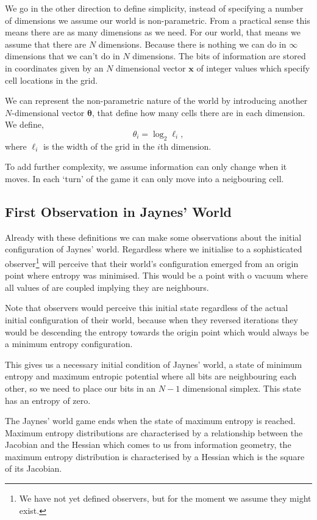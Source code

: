 \documentclass[11pt,a4paper]{article}
\begin{document}
We go in the other direction to define simplicity, instead of specifying a number of dimensions we assume our world is non-parametric. From a practical sense this means there are as many dimensions as we need. For our world, that means we assume that there are $N$ dimensions. Because there is nothing we can do in $\infty$ dimensions that we can't do in $N$ dimensions.  The bits of information are stored in coordinates given by an $N$ dimensional vector $\mathbf{x}$ of integer values which specify cell locations in the grid.

We can represent the non-parametric nature of the world by introducing another $N$-dimensional vector $\boldsymbol{\theta}$, that define how many cells there are in each dimension. We define,
\[
\theta_i = \log_2 \ell_i,
\]
where $\ell_i$ is the width of the grid in the $i$th dimension. 

To add further complexity, we assume information can only change when it moves. In each `turn' of the game it can only move into a neigbouring cell.  

\subsection{First Observation in Jaynes' World}

Already with these definitions we can make some observations about the initial configuration of Jaynes' world. Regardless where we initialise to a sophisticated observer\footnote{We have not yet defined observers, but for the moment we assume they might exist.} will perceive that their world's configuration emerged from an origin point where entropy was minimised. This would be a point with o vacuum where all values of  are coupled implying they are neighbours. 

Note that observers would perceive this initial state regardless of the actual initial configuration of their world, because when they reversed iterations they would be descending the entropy towards the origin point which would always be a minimum entropy configuration. 

This gives us a necessary initial condition of Jaynes' world, a state of minimum entropy and maximum entropic potential where all bits are neighbouring each other, so we need to place our bits in an $N-1$ dimensional simplex. This state has an entropy of zero. 

The Jaynes' world game ends when the state of maximum entropy is reached. Maximum entropy distributions are characterised by a relationship between the Jacobian and the Hessian which comes to us from information geometry, the maximum entropy distribution is characterised by a Hessian which is the square of its Jacobian. 
\end{document}
